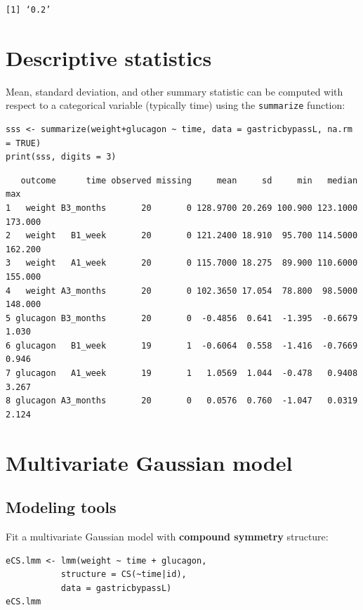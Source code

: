 \documentclass[12pt]{article}
\begin{document}
\begin{verbatim}
[1] ‘0.2’
\end{verbatim}


\clearpage

\section{Descriptive statistics}
\label{sec:orgca24ee1}
Mean, standard deviation, and other summary statistic can be computed
with respect to a categorical variable (typically time) using the
\texttt{summarize} function:
\lstset{language=r,label= ,caption= ,captionpos=b,numbers=none}
\begin{lstlisting}
sss <- summarize(weight+glucagon ~ time, data = gastricbypassL, na.rm = TRUE)
print(sss, digits = 3)
\end{lstlisting}

\begin{verbatim}
   outcome      time observed missing     mean     sd     min   median     max
1   weight B3_months       20       0 128.9700 20.269 100.900 123.1000 173.000
2   weight   B1_week       20       0 121.2400 18.910  95.700 114.5000 162.200
3   weight   A1_week       20       0 115.7000 18.275  89.900 110.6000 155.000
4   weight A3_months       20       0 102.3650 17.054  78.800  98.5000 148.000
5 glucagon B3_months       20       0  -0.4856  0.641  -1.395  -0.6679   1.030
6 glucagon   B1_week       19       1  -0.6064  0.558  -1.416  -0.7669   0.946
7 glucagon   A1_week       19       1   1.0569  1.044  -0.478   0.9408   3.267
8 glucagon A3_months       20       0   0.0576  0.760  -1.047   0.0319   2.124
\end{verbatim}


\clearpage

\section{Multivariate Gaussian model}
\label{sec:org078485b}
\subsection{Modeling tools}
\label{sec:org0f45373}
Fit a multivariate Gaussian model with \textbf{compound symmetry} structure:
\lstset{language=r,label= ,caption= ,captionpos=b,numbers=none}
\begin{lstlisting}
eCS.lmm <- lmm(weight ~ time + glucagon,
	       structure = CS(~time|id),
	       data = gastricbypassL)
eCS.lmm
\end{lstlisting}
\end{document}
